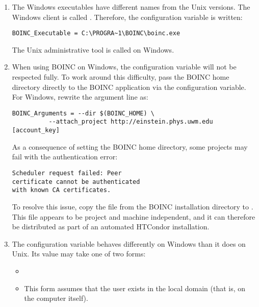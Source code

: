 \begin{enumerate}
\item
The Windows executables have different names from the Unix versions.  
The Windows client is called .
Therefore, the configuration variable  
is written:

\footnotesize
\begin{verbatim}
BOINC_Executable = C:\PROGRA~1\BOINC\boinc.exe
\end{verbatim}
\normalsize

The Unix administrative tool  
is called  on Windows.

  
\item
When using BOINC on Windows, the configuration variable
 will not be respected fully.
To work around this difficulty,
pass the BOINC home directory directly to the BOINC application
via the  configuration variable.
For Windows, rewrite the argument line as:

\footnotesize
\begin{verbatim}
BOINC_Arguments = --dir $(BOINC_HOME) \
          --attach_project http://einstein.phys.uwm.edu [account_key] 
\end{verbatim}
\normalsize

As a consequence of setting the BOINC home directory, some projects may 
fail with the authentication error:
\footnotesize
\begin{verbatim}
Scheduler request failed: Peer 
certificate cannot be authenticated 
with known CA certificates.
\end{verbatim}
\normalsize

To resolve this issue,
copy the  file
from the BOINC installation directory
to .
This file appears to be project and machine independent,
and it can therefore be distributed as part of an 
automated HTCondor installation.

\item
The  configuration variable behaves differently
on Windows than it does on Unix.
Its value may take one of two forms: 
\begin{itemize}

\item 
\verb@domain\user@
\item 
\verb@user@

This form assumes that the user exists in the local domain 
(that is, on the computer itself).
\end{itemize}


\end{enumerate}

